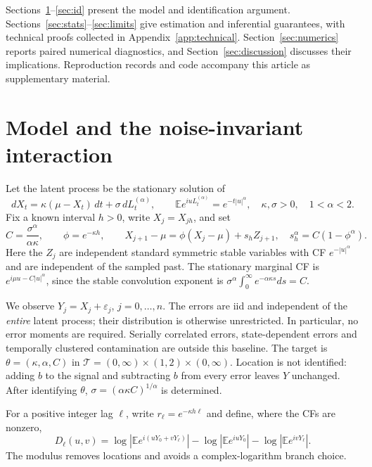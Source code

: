 \documentclass[11pt,a4paper]{article}
\theoremstyle{remark}\newtheorem{remark}[theorem]{Remark}
\newcommand{\E}{\mathbb E}\newcommand{\Pp}{\mathbb P}
\begin{document}
Sections~\ref{sec:model}--\ref{sec:id} present the model and identification argument. Sections~\ref{sec:stats}--\ref{sec:limits} give estimation and inferential guarantees, with technical proofs collected in Appendix~\ref{app:technical}. Section~\ref{sec:numerics} reports paired numerical diagnostics, and Section~\ref{sec:discussion} discusses their implications. Reproduction records and code accompany this article as supplementary material.

\section{Model and the noise-invariant interaction}\label{sec:model}
Let the latent process be the stationary solution of
\begin{equation}\label{eq:sde}
dX_t=\kappa(\mu-X_t)\,dt+\sigma\,dL_t^{(\alpha)},\qquad
\E e^{iuL_t^{(\alpha)}}=e^{-t|u|^\alpha},\quad \kappa,\sigma>0,\quad1<\alpha<2.
\end{equation}
Fix a known interval $h>0$, write $X_j=X_{jh}$, and set
\begin{equation}\label{eq:skeleton}
C=\frac{\sigma^\alpha}{\alpha\kappa},\qquad
\phi=e^{-\kappa h},\qquad
X_{j+1}-\mu=\phi(X_j-\mu)+s_h Z_{j+1},\quad
s_h^\alpha=C(1-\phi^\alpha).
\end{equation}
Here the $Z_j$ are independent standard symmetric stable variables with CF $e^{-|u|^\alpha}$ and are independent of the sampled past. The stationary marginal CF is $e^{i\mu u-C|u|^\alpha}$, since the stable convolution exponent is $\sigma^\alpha\int_0^\infty e^{-\alpha\kappa s}ds=C$.

We observe $Y_j=X_j+\varepsilon_j$, $j=0,\ldots,n$. The errors are iid and independent of the \emph{entire} latent process; their distribution is otherwise unrestricted. In particular, no error moments are required. Serially correlated errors, state-dependent errors and temporally clustered contamination are outside this baseline. The target is $\theta=(\kappa,\alpha,C)$ in
$\mathcal T=(0,\infty)\times(1,2)\times(0,\infty)$.
Location is not identified: adding $b$ to the signal and subtracting $b$ from every error leaves $Y$ unchanged. After identifying $\theta$, $\sigma=(\alpha\kappa C)^{1/\alpha}$ is determined.

For a positive integer lag $\ell$, write $r_\ell=e^{-\kappa h\ell}$ and define, where the CFs are nonzero,
\begin{equation}\label{eq:Ddef}
D_\ell(u,v)=\log|\E e^{i(uY_0+vY_\ell)}|
-\log|\E e^{iuY_0}|-\log|\E e^{ivY_\ell}|.
\end{equation}
The modulus removes locations and avoids a complex-logarithm branch choice.
\end{document}
